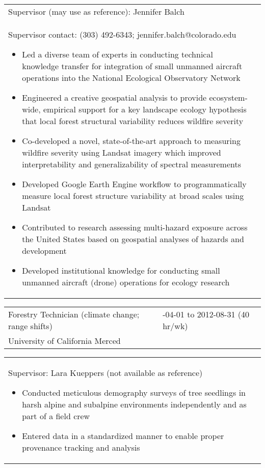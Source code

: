\documentclass[10pt,english]{article}
\providecommand{\tabularnewline}{\\}
\begin{document}
\renewcommand{\arraystretch}{1.2}
\begin{tabularx}{\textwidth}{@{}>{\raggedright}p{6.25in} >{\raggedleft}X@{}}
\addtolength{\leftskip}{5ex}Supervisor (may use as reference): Jennifer Balch \tabularnewline
\addtolength{\leftskip}{5ex}Supervisor contact: (303) 492-6343; jennifer.balch@colorado.edu
\begin{itemize}
\itemsep0em
\item{Led a diverse team of experts in conducting technical knowledge transfer for integration of small unmanned aircraft operations into the National Ecological Observatory Network} 
\item{Engineered a creative geospatial analysis to provide ecosystem-wide, empirical support for a key landscape ecology hypothesis that local forest structural variability reduces wildfire severity}
\item{Co-developed a novel, state-of-the-art approach to measuring wildfire severity using Landsat imagery which improved interpretability and generalizability of spectral measurements}
\item{Developed Google Earth Engine workflow to programmatically measure local forest structure variability at broad scales using Landsat}
\item{Contributed to research assessing multi-hazard exposure across the United States based on geospatial analyses of hazards and development}
\item{Developed institutional knowledge for conducting small unmanned aircraft (drone) operations for ecology research}
\end{itemize}
\end{tabularx}

\renewcommand{\arraystretch}{1.2}
\begin{tabularx}{\textwidth}{@{}>{\raggedright}p{3.75in} >{\raggedleft}X@{}}
Forestry Technician (climate change; range shifts) & 2012-04-01 to 2012-08-31 (40 hr/wk) \tabularnewline
University of California Merced & \tabularnewline
\end{tabularx}

\renewcommand{\arraystretch}{1.2}
\begin{tabularx}{\textwidth}{@{}>{\raggedright}p{6.25in} >{\raggedleft}X@{}}
\addtolength{\leftskip}{5ex}Supervisor: Lara Kueppers (not available as reference)
\begin{itemize}
\itemsep0em
\item{Conducted meticulous demography surveys of tree seedlings in harsh alpine and subalpine environments independently and as part of a field crew}
\item{Entered data in a standardized manner to enable proper provenance tracking and analysis}
\end{itemize}
\end{tabularx}
\end{document}
